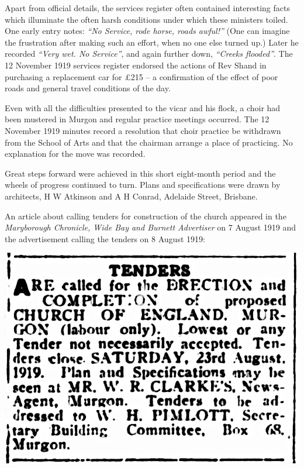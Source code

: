 Apart from official details, the services register often contained interesting facts which illuminate the often harsh conditions under which these ministers toiled. One early entry notes: \emph{``No Service, rode horse, roads awful!''} (One can imagine the frustration after making such an effort, when no one else turned up.) Later he recorded \emph{``Very wet. No Service''}, and again further down, \emph{``Creeks flooded''}. The 12 November 1919 services register endorsed the actions of Rev Shand in purchasing a replacement car for \pounds215 -- a confirmation of the effect of poor roads and general travel conditions of the day.



Even with all the difficulties presented to the vicar and his flock, a choir had been mustered in Murgon and regular practice meetings occurred. The 12 November 1919 minutes record a resolution that choir practice be withdrawn from the School of Arts and that the chairman arrange a place of practicing. No explanation for the move was recorded.



Great steps forward were achieved in this short eight-month period and the wheels of progress continued to turn. Plans and specifications were drawn by architects, H W Atkinson and A H Conrad, Adelaide Street, Brisbane.



An article about calling tenders for construction of the church appeared in the \emph{Maryborough Chronicle, Wide Bay and Burnett Advertiser} on 7 August 1919 and the advertisement calling the tenders on 8 August 1919:



\smallskip








\medskip
\begin{minipage}[b]{\linewidth}
\begin{center}
\includegraphics[width=1.\linewidth,center]{../images/tenderAdvertisement.png}
\end{center}
\end{minipage}
\medskip










